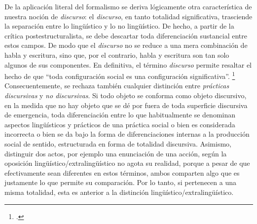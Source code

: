 De la aplicación literal del formalismo se deriva lógicamente otra característica de nuestra noción de \emph{discurso}: el \emph{discurso}, en tanto totalidad significativa, trasciende la separación entre lo lingüístico y lo no lingüístico. De hecho, a partir de la crítica postestructuralista, se debe descartar toda diferenciación sustancial entre estos campos. De modo que el \emph{discurso} no se reduce a una mera combinación de habla y escritura, sino que, por el contrario, habla y escritura son tan solo algunos de sus componentes. En definitiva, el término \emph{discurso} permite resaltar el hecho de que \enquote{toda configuración social es una configuración significativa}. \footcite[][114]{@7026-PALTI2007} Consecuentemente, se rechaza también cualquier distinción entre \emph{prácticas discursivas} y \emph{no discursivas}. Si todo objeto se conforma como objeto discursivo, en la medida que no hay objeto que se dé por fuera de toda superficie discursiva de emergencia, toda diferenciación entre lo que habitualmente se denominan aspectos lingüísticos y prácticos de una práctica social o bien es considerada incorrecta o bien se da bajo la forma de diferenciaciones internas a la producción social de sentido, estructurada en forma de totalidad discursiva. Asimismo, distinguir dos actos, por ejemplo una enunciación de una acción, según la oposición lingüístico/extralingüístico no agota su realidad, porque a pesar de que efectivamente sean diferentes en estos términos, ambos comparten algo  que es justamente lo que permite su comparación. Por lo tanto, si pertenecen a una misma totalidad, esta es anterior a la distinción lingüístico/extralingüístico.


